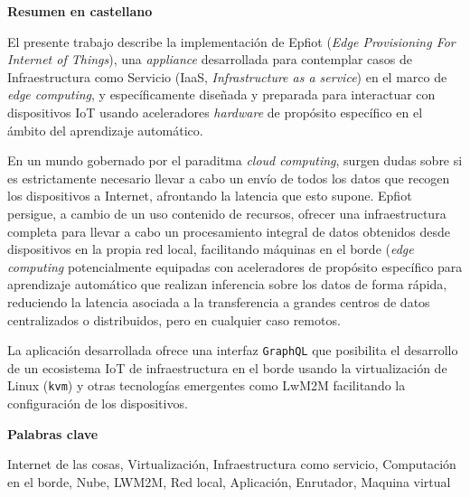 
\newpage

\thispagestyle{empty}

\begin{center}

{\bf \Huge Resumen en castellano}

  \end{center}
\vspace{1cm}

El presente trabajo describe la implementación de {\sc Epfiot} ({\em Edge Provisioning For Internet of Things}), una \textit{appliance} desarrollada para contemplar casos de Infraestructura como Servicio (IaaS, {\em Infrastructure as a service}) en el marco de \textit{edge computing}, y específicamente diseñada y preparada para interactuar con dispositivos IoT usando aceleradores {\em hardware} de propósito específico en el ámbito del aprendizaje automático.

En un mundo gobernado por el paraditma \textit{cloud computing}, surgen dudas sobre si es estrictamente necesario llevar a cabo un envío de todos los datos que recogen los dispositivos a Internet, afrontando la latencia que esto supone. 
%
{\sc Epfiot} persigue, a cambio de un uso contenido de recursos, ofrecer una  infraestructura completa para llevar a cabo un procesamiento integral de datos obtenidos desde dispositivos en la propia red local, facilitando máquinas en el borde ({\em edge computing} potencialmente equipadas con aceleradores de propósito específico para aprendizaje automático que realizan inferencia sobre los datos de forma rápida, reduciendo la latencia asociada a la transferencia a grandes centros de datos centralizados o distribuidos, pero en cualquier caso remotos.

La aplicación desarrollada ofrece una interfaz \texttt{GraphQL} que posibilita el desarrollo de un ecosistema IoT de infraestructura en el borde usando la virtualización de Linux ({\tt kvm}) y otras tecnologías emergentes como LwM2M facilitando la configuración de los dispositivos.

\vspace{1cm}


\begin{center}

{\bf \Large Palabras clave}

   \end{center}

   \vspace{0.5cm}
   
   Internet de las cosas, Virtualización, Infraestructura como servicio, Computación en el borde, Nube, LWM2M, Red local, Aplicación, Enrutador, Maquina virtual
   


